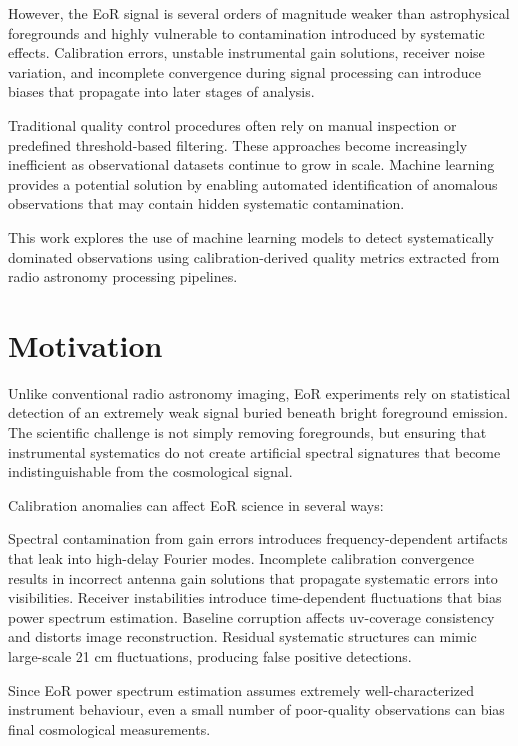 \documentclass[linenumbers,trackchanges]{aastex701}
\begin{document}
However, the EoR signal is several orders of magnitude weaker than astrophysical foregrounds and highly vulnerable to contamination introduced by systematic effects. Calibration errors, unstable instrumental gain solutions, receiver noise variation, and incomplete convergence during signal processing can introduce biases that propagate into later stages of analysis.

Traditional quality control procedures often rely on manual inspection or predefined threshold-based filtering. These approaches become increasingly inefficient as observational datasets continue to grow in scale. Machine learning provides a potential solution by enabling automated identification of anomalous observations that may contain hidden systematic contamination.

This work explores the use of machine learning models to detect systematically dominated observations using calibration-derived quality metrics extracted from radio astronomy processing pipelines.

\section{Motivation} \label{sec:motivation}

Unlike conventional radio astronomy imaging, EoR experiments rely on statistical detection of an extremely weak signal buried beneath bright foreground emission. The scientific challenge is not simply removing foregrounds, but ensuring that instrumental systematics do not create artificial spectral signatures that become indistinguishable from the cosmological signal.

Calibration anomalies can affect EoR science in several ways:

Spectral contamination from gain errors introduces frequency-dependent artifacts that leak into high-delay Fourier modes.
Incomplete calibration convergence results in incorrect antenna gain solutions that propagate systematic errors into visibilities.
Receiver instabilities introduce time-dependent fluctuations that bias power spectrum estimation.
Baseline corruption affects uv-coverage consistency and distorts image reconstruction.
Residual systematic structures can mimic large-scale 21 cm fluctuations, producing false positive detections.

Since EoR power spectrum estimation assumes extremely well-characterized instrument behaviour, even a small number of poor-quality observations can bias final cosmological measurements.
\end{document}
